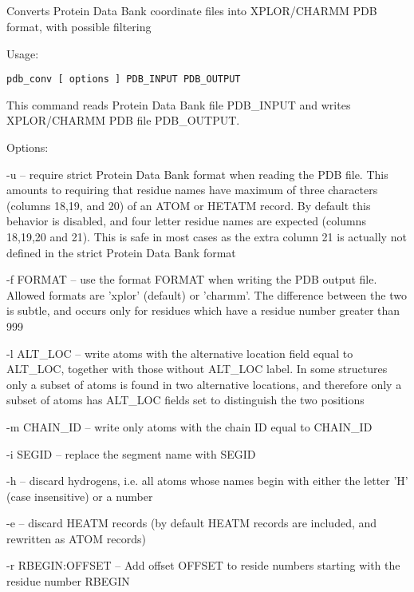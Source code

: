 

\subsection[pdb\_conv]{  }



Converts Protein Data Bank coordinate files into XPLOR/CHARMM
 PDB format, with possible filtering


\begin{description}


\item{Usage:}

{\tt pdb\_conv [ options ] PDB\_INPUT PDB\_OUTPUT}

This command reads Protein Data Bank file PDB\_INPUT and writes
XPLOR/CHARMM PDB file PDB\_OUTPUT.


\item{Options:}
\begin{description}
\item -u -- require strict Protein Data Bank format when reading
 the PDB file. This amounts to requiring that residue names
 have maximum of three characters (columns 18,19, and 20) of
 an ATOM or HETATM record. By default this behavior is disabled,
 and four letter residue names are expected (columns 18,19,20
 and 21). This is safe in most cases as the extra column 21 is
 actually not defined in the strict Protein Data Bank format
\item -f FORMAT -- use the format FORMAT when writing the PDB
 output file. Allowed formats are 'xplor' (default) or 'charmm'.
 The difference between the two is subtle, and occurs only for
 residues which have a residue number greater than 999
\item -l ALT\_LOC -- write atoms with the alternative location
 field equal to ALT\_LOC, together with those without ALT\_LOC
 label. In some structures only a subset of atoms is found in
 two alternative locations, and therefore only a subset of atoms
 has ALT\_LOC fields set to distinguish the two positions
\item -m CHAIN\_ID -- write only atoms with the chain ID equal
 to CHAIN\_ID
\item -i SEGID -- replace the segment name with SEGID
\item -h -- discard hydrogens, i.e. all atoms whose names begin with
 either the letter 'H' (case insensitive) or a number
\item -e -- discard HEATM records (by default HEATM records are
 included, and rewritten as ATOM records)
\item -r RBEGIN:OFFSET -- Add offset OFFSET to reside numbers
 starting with the residue number RBEGIN
\end{description}


\end{description}

